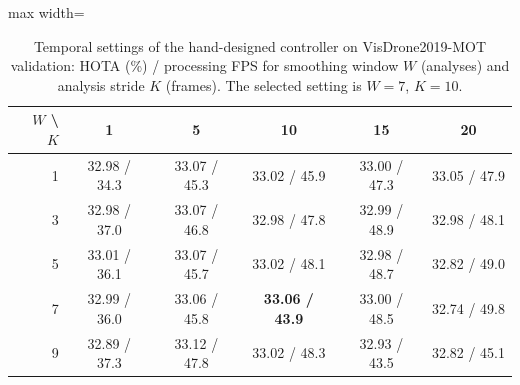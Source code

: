 \begin{table}[tbp]
\centering
\caption{Temporal settings of the hand-designed controller on VisDrone2019-MOT validation: HOTA (\%) / processing FPS for smoothing window $W$ (analyses) and analysis stride $K$ (frames). The selected setting is $W=7$, $K=10$.}
\label{tab:ch4-temporal}
\small\setlength{\tabcolsep}{4pt}
\begin{adjustbox}{max width=\textwidth}
\begin{tabular}{rccccc}
\hline
$W$ \textbackslash{} $K$ & 1 & 5 & 10 & 15 & 20 \\
\hline
1 & 32.98 / 34.3 & 33.07 / 45.3 & 33.02 / 45.9 & 33.00 / 47.3 & 33.05 / 47.9 \\
3 & 32.98 / 37.0 & 33.07 / 46.8 & 32.98 / 47.8 & 32.99 / 48.9 & 32.98 / 48.1 \\
5 & 33.01 / 36.1 & 33.07 / 45.7 & 33.02 / 48.1 & 32.98 / 48.7 & 32.82 / 49.0 \\
7 & 32.99 / 36.0 & 33.06 / 45.8 & \textbf{33.06 / 43.9} & 33.00 / 48.5 & 32.74 / 49.8 \\
9 & 32.89 / 37.3 & 33.12 / 47.8 & 33.02 / 48.3 & 32.93 / 43.5 & 32.82 / 45.1 \\
\hline
\end{tabular}
\end{adjustbox}
\end{table}
